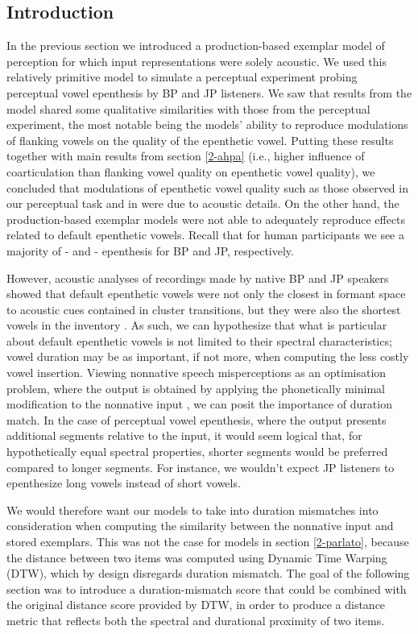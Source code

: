 \subsection{Introduction}
In the previous section we introduced a production-based exemplar model of perception for which input representations were solely acoustic. We used this relatively primitive model to simulate a perceptual experiment probing perceptual vowel epenthesis by BP and JP listeners. We saw that results from the model shared some qualitative similarities with those from the perceptual experiment, the most notable being the models' ability to reproduce modulations of flanking vowels on the quality of the epenthetic vowel. Putting these results together with main results from section \ref{2-ahpa} (i.e., higher influence of coarticulation than flanking vowel quality on epenthetic vowel quality), we concluded that modulations of epenthetic vowel quality such as those observed in our perceptual task and in \cite{dupoux2011} were due to acoustic details.
On the other hand, the production-based exemplar models were not able to adequately reproduce effects related to default epenthetic vowels. Recall that for human participants we see a majority of - and - epenthesis for BP and JP, respectively.

However, acoustic analyses of recordings made by native BP and JP speakers showed that default epenthetic vowels were not only the closest in formant space to acoustic cues contained in cluster transitions, but they were also the shortest vowels in the inventory . As such, we can hypothesize that what is particular about default epenthetic vowels is not limited to their spectral characteristics; vowel duration may be as important, if not more, when computing the less costly vowel insertion. Viewing nonnative speech misperceptions as an optimisation problem, where the output is obtained by applying the phonetically minimal modification to the nonnative input \cite{peperkamp2003, dupoux2011, steriade2001}, we can posit the importance of duration match. In the case of perceptual vowel epenthesis, where the output presents additional segments relative to the input, it would seem logical that, for hypothetically equal spectral properties, shorter segments would be preferred compared to longer segments. For instance, we wouldn't expect JP listeners to epenthesize long vowels instead of short vowels.

We would therefore want our models to take into duration mismatches into consideration when computing the similarity between the nonnative input and stored exemplars. This was not the case for models in section \ref{2-parlato}, because the distance between two items was computed using Dynamic Time Warping (DTW), which by design disregards duration mismatch. The goal of the following section was to introduce a duration-mismatch score that could be combined with the original distance score provided by DTW, in order to produce a distance metric that reflects both the spectral and durational proximity of two items.

